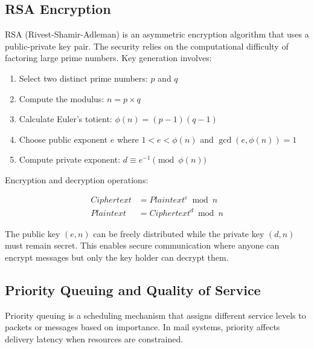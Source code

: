 \documentclass[12pt]{article}
\begin{document}
	\subsection{RSA Encryption}
	
	RSA (Rivest-Shamir-Adleman) is an asymmetric encryption algorithm that uses a public-private key pair. The security relies on the computational difficulty of factoring large prime numbers. Key generation involves:
	
	\begin{enumerate}
		\item Select two distinct prime numbers: $p$ and $q$
		\item Compute the modulus: $n = p \times q$
		\item Calculate Euler's totient: $\phi(n) = (p-1)(q-1)$
		\item Choose public exponent $e$ where $1 < e < \phi(n)$ and $\gcd(e, \phi(n)) = 1$
		\item Compute private exponent: $d \equiv e^{-1} \pmod{\phi(n)}$
	\end{enumerate}
	
	Encryption and decryption operations:
	
	\begin{align}
		Ciphertext &= Plaintext^e \bmod n \\
		Plaintext &= Ciphertext^d \bmod n
	\end{align}
	
	The public key $(e, n)$ can be freely distributed while the private key $(d, n)$ must remain secret. This enables secure communication where anyone can encrypt messages but only the key holder can decrypt them.
	
	\subsection{Priority Queuing and Quality of Service}
	
	Priority queuing is a scheduling mechanism that assigns different service levels to packets or messages based on importance. In mail systems, priority affects delivery latency when resources are constrained.
	
\end{document}
